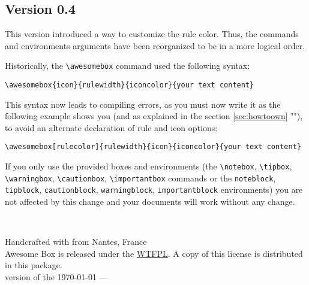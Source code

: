 \documentclass[a4paper,12pt]{article}
\newcommand{\colophon}{
  ~\vfill
  \begin{center}
    \scriptsize Handcrafted with \faHeart{} from Nantes,
    France\\
    Awesome Box is released under the
    \hrefcolor{http://www.wtfpl.net/txt/copying/}{WTFPL}. A copy of this
    license is distributed in this package.\\
    \tiny version of the \today{} --- \currenttime
  \end{center}
}
\newcommand\hrefcolor[2]{\textcolor{magenta}{\href{#1}{#2}}}
\begin{document}
\subsection{Version 0.4}

This version introduced a way to customize the rule color. Thus, the
commands and environments arguments have been reorganized to be in a
more logical order.

Historically, the \verb!\awesomebox! command used the following syntax:

\begin{center}
\verb!\awesomebox{icon}{rulewidth}{iconcolor}{your text content}!
\end{center}

This syntax now leads to compiling errors, as you must now write it
as the following example shows you (and as explained in the section
\ref{sec:howtoown} ""), to avoid an alternate
declaration of rule and icon options:

\begin{center}
\verb!\awesomebox[rulecolor]{rulewidth}{icon}{iconcolor}{your text content}!
\end{center}

If you only use the provided boxes and environments (the
\verb!\notebox!, \verb!\tipbox!, \texttt{\textbackslash warn\-ing\-box},
\verb!\cautionbox!, \verb!\importantbox! commands or the
\texttt{noteblock}, \texttt{tipblock}, \texttt{caution\-block},
\texttt{warningblock}, \texttt{importantblock} environments) you are not
affected by this change and your documents will work without any change.

\colophon
\end{document}
